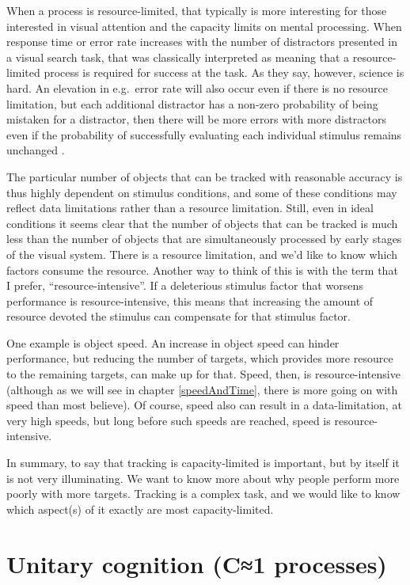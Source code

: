 \documentclass[
]{book}
\begin{document}
When a process is resource-limited, that typically is more interesting for those interested in visual attention and the capacity limits on mental processing. When response time or error rate increases with the number of distractors presented in a visual search task, that was classically interpreted as meaning that a resource-limited process is required for success at the task. As they say, however, science is hard. An elevation in e.g.~error rate will also occur even if there is no resource limitation, but each additional distractor has a non-zero probability of being mistaken for a distractor, then there will be more errors with more distractors even if the probability of successfully evaluating each individual stimulus remains unchanged \citep{palmerAttentionVisualSearch1995}.

The particular number of objects that can be tracked with reasonable accuracy is thus highly dependent on stimulus conditions, and some of these conditions may reflect data limitations rather than a resource limitation. Still, even in ideal conditions it seems clear that the number of objects that can be tracked is much less than the number of objects that are simultaneously processed by early stages of the visual system. There is a resource limitation, and we'd like to know which factors consume the resource. Another way to think of this is with the term that I prefer, ``resource-intensive''. If a deleterious stimulus factor that worsens performance is resource-intensive, this means that increasing the amount of resource devoted the stimulus can compensate for that stimulus factor.

One example is object speed. An increase in object speed can hinder performance, but reducing the number of targets, which provides more resource to the remaining targets, can make up for that. Speed, then, is resource-intensive (although as we will see in chapter \ref{speedAndTime}, there is more going on with speed than most believe). Of course, speed also can result in a data-limitation, at very high speeds, but long before such speeds are reached, speed is resource-intensive.

In summary, to say that tracking is capacity-limited is important, but by itself it is not very illuminating. We want to know more about why people perform more poorly with more targets. Tracking is a complex task, and we would like to know which aspect(s) of it exactly are most capacity-limited.

\hypertarget{unitary-cognition-c1-processes}{%
\section{Unitary cognition (C≈1 processes)}\label{unitary-cognition-c1-processes}}
\end{document}

